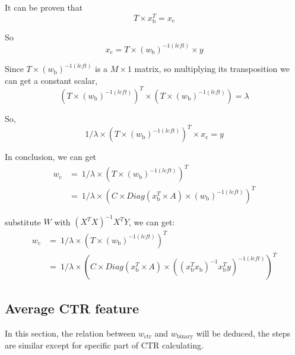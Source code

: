 It can be proven that 
\begin{equation}
T \times x_{\text{b}}^T =  x_{\text{c}}
\end{equation}

So
\begin{equation}
x_{\text{c}} =  T \times (w_{\text{b}})^{-1(left)} \times y 
\end{equation}

Since \(T \times (w_{\text{b}})^{-1(left)}\) is a \(M \times 1\) matrix, so multiplying its transposition we can get a constant scalar, 
\begin{equation}
(T \times (w_{\text{b}})^{-1(left)})^T \times (T \times (w_{\text{b}})^{-1(left)}) = \lambda
\end{equation}

So, 
\begin{equation}
1/{\lambda} \times (T \times (w_{\text{b}})^{-1(left)})^T \times x_{\text{c}} =  y
\end{equation}

In conclusion, we can get
\begin{equation} \label{eq:12}
\begin{split}
w_{\text{c}} & =\ 1/{\lambda} \times (T \times (w_{\text{b}})^{-1(left)})^T \\
& = \ 1/{\lambda} \times (C \times Diag(x_{\text{b}}^T \times A) \times (w_{\text{b}})^{-1(left)})^T
\end{split}
\end{equation}

substitute \(W\) with \((X^T X)^{-1} X^T Y\), we can get:
\begin{equation} \label{eq:13}
\begin{split}
w_{\text{c}} & =\ 1/{\lambda} \times (T \times (w_{\text{b}})^{-1(left)})^T \\
& = \ 1/{\lambda} \times (C \times Diag(x_{\text{b}}^T \times A) \times ((x_{\text{b}}^T x_{\text{b}})^{-1} x_{\text{b}}^T y)^{-1(left)})^T
\end{split}
\end{equation}

\subsection{Average CTR feature}

\setlength{\parindent}{5ex}

In this section, the relation between  \(w_{\text{ctr}}\) and \(w_{\text{binary}}\) will be deduced, the steps are similar except for specific part of CTR calculating. 


